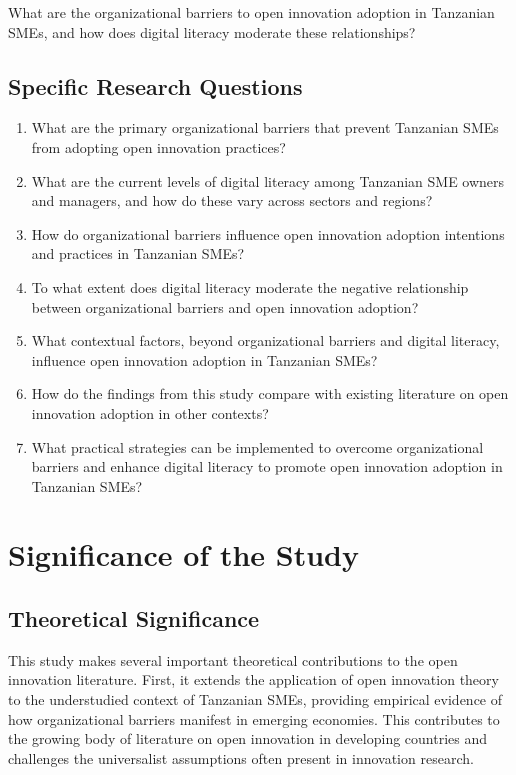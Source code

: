 \documentclass[12pt,a4paper]{article}
\begin{document}
What are the organizational barriers to open innovation adoption in Tanzanian SMEs, and how does digital literacy moderate these relationships?

\subsection{Specific Research Questions}

\begin{enumerate}
\item What are the primary organizational barriers that prevent Tanzanian SMEs from adopting open innovation practices?
\item What are the current levels of digital literacy among Tanzanian SME owners and managers, and how do these vary across sectors and regions?
\item How do organizational barriers influence open innovation adoption intentions and practices in Tanzanian SMEs?
\item To what extent does digital literacy moderate the negative relationship between organizational barriers and open innovation adoption?
\item What contextual factors, beyond organizational barriers and digital literacy, influence open innovation adoption in Tanzanian SMEs?
\item How do the findings from this study compare with existing literature on open innovation adoption in other contexts?
\item What practical strategies can be implemented to overcome organizational barriers and enhance digital literacy to promote open innovation adoption in Tanzanian SMEs?
\end{enumerate}

\section{Significance of the Study}

\subsection{Theoretical Significance}

This study makes several important theoretical contributions to the open innovation literature. First, it extends the application of open innovation theory to the understudied context of Tanzanian SMEs, providing empirical evidence of how organizational barriers manifest in emerging economies. This contributes to the growing body of literature on open innovation in developing countries and challenges the universalist assumptions often present in innovation research.
\end{document}
